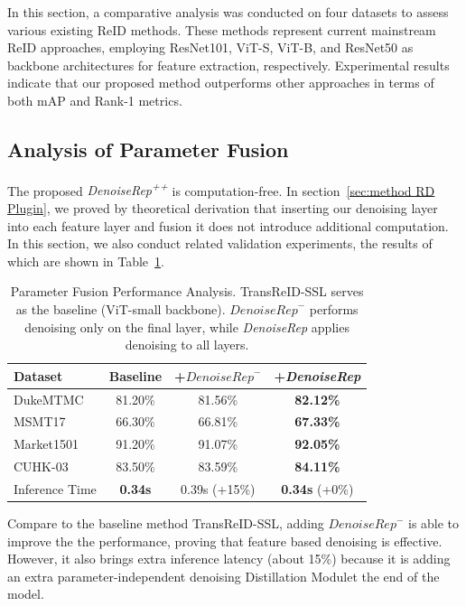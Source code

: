\documentclass[conference]{IEEEtran}
\begin{document}
{In this section, a comparative analysis was conducted on four datasets to assess various existing ReID methods. These methods represent current mainstream ReID approaches, employing ResNet101, ViT-S, ViT-B, and ResNet50 as backbone architectures for feature extraction, respectively. Experimental results indicate that our proposed method outperforms other approaches in terms of both mAP and Rank-1 metrics.


\subsection{Analysis of Parameter Fusion}
The proposed \textit{DenoiseRep\textsuperscript{++}} is computation-free. In section~\ref{sec:method RD Plugin}, we proved by theoretical derivation that inserting our denoising layer into each feature layer and fusion it does not introduce additional computation. In this section, we also conduct related validation experiments, the results of which are shown in Table~\ref{tab:reparameterization_single}.

\begin{table}[t]
\centering
\caption{Parameter Fusion Performance Analysis. 
TransReID-SSL serves as the baseline (ViT-small backbone). 
$\textit{DenoiseRep}^{-}$ performs denoising only on the final layer, 
while \textit{DenoiseRep} applies denoising to all layers.}
\label{tab:reparameterization_single}
\vspace{0.15cm}
\renewcommand{\arraystretch}{1.15}
\begin{tabular}{l|c|c|c}
\hline \hline
\textbf{Dataset} & \textbf{Baseline} & \textbf{+$\textit{DenoiseRep}^{-}$} & \textbf{+\textit{DenoiseRep}} \\
\hline
DukeMTMC   & 81.20\% & 81.56\% & \textbf{82.12\%} \\
MSMT17     & 66.30\% & 66.81\% & \textbf{67.33\%} \\
Market1501 & 91.20\% & 91.07\% & \textbf{92.05\%} \\
CUHK-03    & 83.50\% & 83.59\% & \textbf{84.11\%} \\
\hline
Inference Time & \textbf{0.34s} & 0.39s (+15\%) & \textbf{0.34s} (+0\%) \\
\hline \hline
\end{tabular}
\end{table}

Compare to the baseline method TransReID-SSL, adding $\textit{DenoiseRep}^{-}$ is able to improve the the performance, proving that feature based denoising is effective. However, it also brings extra inference latency (about 15\%) because it is adding an extra parameter-independent denoising Distillation Modulet the end of the model. 

}
\end{document}

